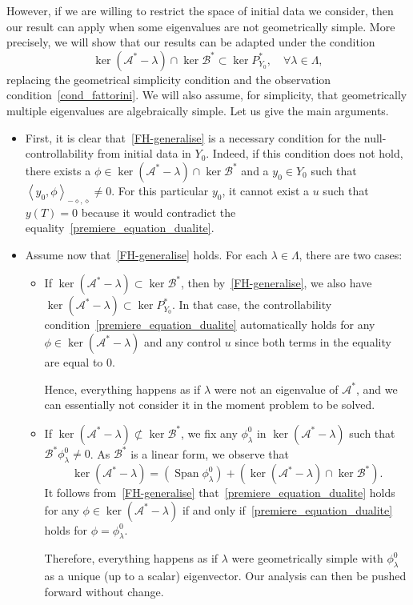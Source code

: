 \documentclass[10pt]{amsart}
\theoremstyle{definition}\newtheorem{defi}[theo]{Definition}\newtheorem{rema}[theo]{Remark}\newtheorem{exam}[theo]{Example}\newtheorem{exem}[theo]{Example}\newtheorem{nota}[theo]{Notation}
\newcommand\As{\mathcal{A}^*}
\newcommand\Bs{\mathcal{B}^*}
\newcommand{\Fzp}{Y_0}
\newcommand{\dual}[2]{\left\langle #1, #2 \right\rangle_{-\diamond,\diamond}}
\newcommand{\PFa}{P_{\Fzp}^*}
\DeclareMathOperator{\Span}{Span}
\let\oldforall\forall
\renewcommand*{\forall}{\mathrel{\oldforall}}
\begin{document}
However, if we are willing to restrict the space of initial data we consider, then our result can apply when some eigenvalues are not geometrically simple. More precisely, we will show that our results can be adapted under the condition
\begin{equation}\label{FH-generalise}
\ker(\As-\lambda) \cap \ker \Bs \subset \ker \PFa, \quad \forall \lambda \in \Lambda,
\end{equation}
replacing the geometrical simplicity condition and the observation condition~\eqref{cond_fattorini}. We will also assume, for simplicity, that geometrically multiple eigenvalues are algebraically simple. Let us give the main arguments.
\begin{itemize}
\item First, it is clear that~\eqref{FH-generalise} is a necessary condition for the null-controllability from initial data in $\Fzp$. Indeed, if this condition does not hold, there exists a $\phi\in \ker(\As-\lambda) \cap \ker \Bs$ and a $y_0\in \Fzp$ such that $\dual{y_0}{\phi}\neq 0$. For this particular $y_0$, it cannot exist a $u$ such that $y(T)=0$ because it would contradict the equality~\eqref{premiere_equation_dualite}.
\item Assume now that~\eqref{FH-generalise} holds. For each $\lambda\in \Lambda$, there are two cases:
\begin{itemize}
\item If $\ker(\As-\lambda)\subset \ker \Bs$, then by~\eqref{FH-generalise}, we also have $\ker(\As-\lambda)\subset \ker \PFa$. In that case, the controllability condition~\eqref{premiere_equation_dualite} automatically holds for any $\phi\in \ker(\As-\lambda)$ and any control $u$ since both terms in the equality are equal to $0$.

Hence, everything happens as if $\lambda$ were not an eigenvalue of $\As$, and we can essentially not consider it in the moment problem to be solved.
\item If $\ker(\As-\lambda)\not\subset \ker \Bs$, we fix any $\phi_\lambda^0$ in $\ker(\As-\lambda)$ such that $\Bs \phi_\lambda^0\neq 0$. As $\Bs$ is a linear form, we observe that
\[
\ker(\As-\lambda) = \left(\Span \phi_\lambda^0\right) + \left(\ker(\As-\lambda)\cap \ker \Bs\right).
\]
It follows from~\eqref{FH-generalise} that~\eqref{premiere_equation_dualite} holds for any $\phi\in \ker(\As-\lambda)$ if and only if~\eqref{premiere_equation_dualite} holds for $\phi=\phi_\lambda^0$.

Therefore, everything happens as if $\lambda$ were geometrically simple with $\phi_\lambda^0$ as a unique (up to a scalar) eigenvector. Our analysis can then be pushed forward without change.
\end{itemize}
\end{itemize}
\end{document}
